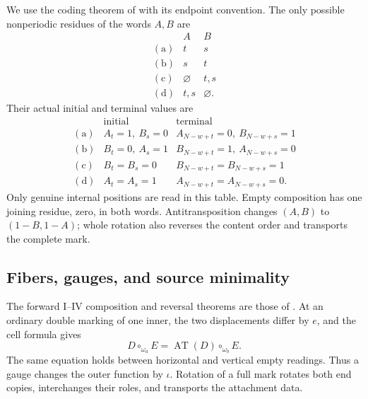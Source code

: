 \documentclass[11pt,a4paper]{amsart}
\numberwithin{equation}{section}
\theoremstyle{plain}
\theoremstyle{definition}
\newcommand{\AT}{\operatorname{AT}}
\newcommand{\ii}{\iota}
\begin{document}
We use the coding theorem of \cite[Boundary coding lemma]{Shields2026Gluing} with its endpoint convention.  The only possible nonperiodic residues of the words \(A,B\) are
\begin{equation}\label{eq:holes}
 \begin{array}{c|cc}
 &A&B\\\hline
 \mathrm{(a)}&t&s\\
 \mathrm{(b)}&s&t\\
 \mathrm{(c)}&\varnothing&t,s\\
 \mathrm{(d)}&t,s&\varnothing.
 \end{array}
\end{equation}
Their actual initial and terminal values are
\begin{equation}\label{eq:cap-table}
 \begin{array}{c|cc}
 &\text{initial}&\text{terminal}\\\hline
 \mathrm{(a)}&A_t=1,\ B_s=0&A_{N-w+t}=0,\ B_{N-w+s}=1\\
 \mathrm{(b)}&B_t=0,\ A_s=1&B_{N-w+t}=1,\ A_{N-w+s}=0\\
 \mathrm{(c)}&B_t=B_s=0&B_{N-w+t}=B_{N-w+s}=1\\
 \mathrm{(d)}&A_t=A_s=1&A_{N-w+t}=A_{N-w+s}=0.
 \end{array}
\end{equation}
Only genuine internal positions are read in this table.  Empty composition has one joining residue, zero, in both words.  Antitransposition changes \((A,B)\) to \((1-B,1-A)\); whole rotation also reverses the content order and transports the complete mark.

\subsection{Fibers, gauges, and source minimality}

The forward I--IV composition and reversal theorems are those of \cite{OlsonHarris2024HopfApplications}.  At an ordinary double marking of one inner, the two displacements differ by \(e\), and the cell formula gives
\begin{equation}\label{eq:gauge}
 D\circ_{\omega_a}E=\AT(D)\circ_{\omega_b}E.
\end{equation}
The same equation holds between horizontal and vertical empty readings.  Thus a gauge changes the outer function by \(\ii\).  Rotation of a full mark rotates both end copies, interchanges their roles, and transports the attachment data.
\end{document}

